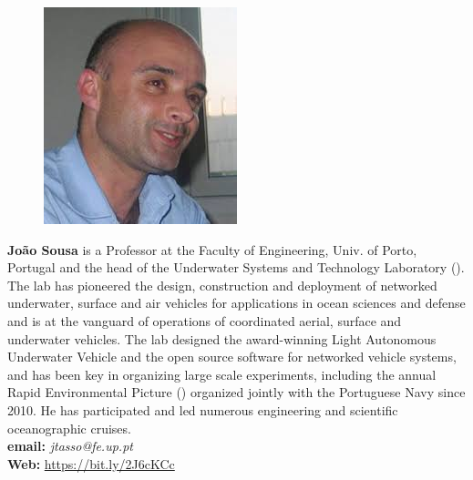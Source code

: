 \vspace*{3cm}
\parbox{5.5in}{
\begin{figure} %
  \vspace{-\intextsep}
    \hspace*{-.35\columnsep}\includegraphics[scale=0.7]{fig/JBS.jpg}
\end{figure}
\textbf{Jo\~ao Sousa} is a Professor at the Faculty of Engineering,
Univ. of Porto, Portugal and the head of the Underwater Systems and
Technology Laboratory (\lse). The lab has pioneered the design,
construction and deployment of networked underwater, surface and air
vehicles for applications in ocean sciences and defense and is at the
vanguard of operations of coordinated aerial, surface and underwater
vehicles. The lab designed the award-winning Light Autonomous
Underwater Vehicle and the \ls open source software for networked
vehicle systems, and has been key in organizing large scale
experiments, including the annual Rapid Environmental Picture (\rpe)
organized jointly with the Portuguese Navy since 2010. He has
participated and led numerous engineering and scientific oceanographic
cruises.
\\
\textbf{email: }\emph{jtasso@fe.up.pt}\\
\textbf{Web: }\url{https://bit.ly/2J6cKCc}}

